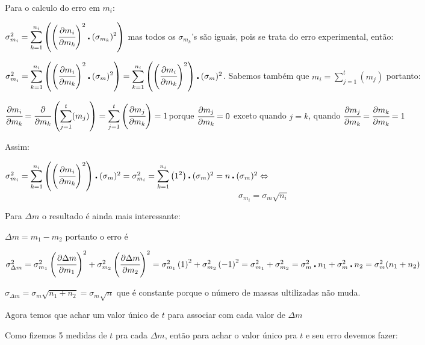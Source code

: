 \documentclass{article}
\begin{document}
Para o calculo do erro em $m_{i}$:

$\sigma_{m_{i}}^{2}={\displaystyle \sum_{k=1}^{n_{i}}\left(\left(\cfrac{\partial m_{i}}{\partial m_{k}}\right)^{2}\centerdot(\sigma_{m_{k}})^{2}\right)}$
mas todos os $\sigma_{m_{k}}$'s são iguais, pois se trata do erro
experimental, então:

$\sigma_{m_{i}}^{2}={\displaystyle \sum_{k=1}^{n_{i}}\left(\left(\cfrac{\partial m_{i}}{\partial m_{k}}\right)^{2}\centerdot(\sigma_{m})^{2}\right)}={\displaystyle \sum_{k=1}^{n_{i}}\left(\left(\cfrac{\partial m_{i}}{\partial m_{k}}\right)^{2}\right)}\centerdot(\sigma_{m})^{2}$.
Sabemos também que $m_{i}={\displaystyle \sum_{j=1}^{t}(m_{j})}$
portanto:

$\cfrac{\partial m_{i}}{\partial m_{k}}=\cfrac{\partial}{\partial m_{k}}\left({\displaystyle \sum_{j=1}^{t}(m_{j})}\right)={\displaystyle \sum_{j=1}^{t}\left(\cfrac{\partial m_{j}}{\partial m_{k}}\right)=1}$porque
$\cfrac{\partial m_{j}}{\partial m_{k}}=0$ exceto quando $j=k$,
quando $\cfrac{\partial m_{j}}{\partial m_{k}}=\cfrac{\partial m_{k}}{\partial m_{k}}=1$

Assim:

$\sigma_{m_{i}}^{2}={\displaystyle \sum_{k=1}^{n_{i}}\left(\left(\cfrac{\partial m_{i}}{\partial m_{k}}\right)^{2}\right)}\centerdot(\sigma_{m})^{2}=\sigma_{m_{i}}^{2}={\displaystyle \sum_{k=1}^{n_{i}}\left(1^{2}\right)}\centerdot(\sigma_{m})^{2}={\displaystyle n}\centerdot(\sigma_{m})^{2}\Leftrightarrow$
\[
\sigma_{m_{i}}=\sigma_{m}\sqrt{n_{i}}
\]


Para $\Delta m$ o resultado é ainda mais interessante:

$\Delta m=m_{1}-m_{2}$ portanto o erro é 

$\sigma_{\Delta m}^{2}=\sigma_{m_{1}}^{2}\left(\cfrac{\partial\Delta m}{\partial m_{1}}\right)^{2}+\sigma_{m_{2}}^{2}\left(\cfrac{\partial\Delta m}{\partial m_{2}}\right)^{2}=\sigma_{m_{1}}^{2}\left(1\right)^{2}+\sigma_{m_{2}}^{2}\left(-1\right)^{2}=\sigma_{m_{1}}^{2}+\sigma_{m_{2}}^{2}=\sigma_{m}^{2}\centerdot n_{1}+\sigma_{m}^{2}\centerdot n_{2}=\sigma_{m}^{2}(n_{1}+n_{2})$

$\sigma_{\Delta m}=\sigma_{m}\sqrt{n_{1}+n_{2}}=\sigma_{m}\sqrt{n}$
que é constante porque o número de massas ultilizadas não muda.

Agora temos que achar um valor único de $t$ para associar com cada
valor de $\Delta m$

Como fizemos 5 medidas de $t$ pra cada $\Delta m$, então para achar
o valor único pra $t$ e seu erro devemos fazer:
\end{document}
